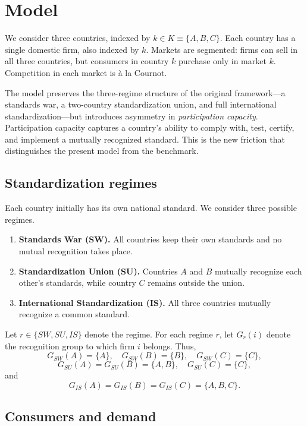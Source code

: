 \section{Model}

We consider three countries, indexed by $k \in K \equiv \{A,B,C\}$. Each country has a single domestic firm, also indexed by $k$. Markets are segmented: firms can sell in all three countries, but consumers in country $k$ purchase only in market $k$. Competition in each market is \`a la Cournot.

The model preserves the three-regime structure of the original framework---a standards war, a two-country standardization union, and full international standardization---but introduces asymmetry in \emph{participation capacity}. Participation capacity captures a country's ability to comply with, test, certify, and implement a mutually recognized standard. This is the new friction that distinguishes the present model from the benchmark.

\subsection{Standardization regimes}

Each country initially has its own national standard. We consider three possible regimes.

\begin{enumerate}
    \item \textbf{Standards War (SW).} All countries keep their own standards and no mutual recognition takes place.
    \item \textbf{Standardization Union (SU).} Countries $A$ and $B$ mutually recognize each other's standards, while country $C$ remains outside the union.
    \item \textbf{International Standardization (IS).} All three countries mutually recognize a common standard.
\end{enumerate}

Let $r \in \{SW,SU,IS\}$ denote the regime. For each regime $r$, let $G_r(i)$ denote the recognition group to which firm $i$ belongs. Thus,
\[
G_{SW}(A)=\{A\},\quad G_{SW}(B)=\{B\},\quad G_{SW}(C)=\{C\},
\]
\[
G_{SU}(A)=G_{SU}(B)=\{A,B\},\quad G_{SU}(C)=\{C\},
\]
and
\[
G_{IS}(A)=G_{IS}(B)=G_{IS}(C)=\{A,B,C\}.
\]

\subsection{Consumers and demand}

